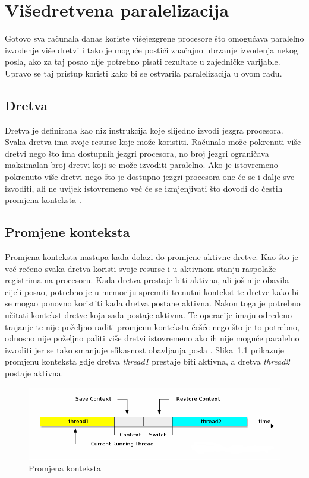 \documentclass[times, utf8, zavrsni]{fer}
\begin{document}
\chapter{Višedretvena paralelizacija}
Gotovo sva računala danas koriste višejezgrene procesore što omogućava paralelno izvođenje više dretvi i tako je moguće postići značajno ubrzanje izvođenja nekog posla, ako za taj posao nije potrebno pisati rezultate u zajedničke varijable. Upravo se taj pristup koristi kako bi se ostvarila paralelizacija u ovom radu.

\section{Dretva}
Dretva je definirana kao niz instrukcija koje slijedno izvodi jezgra procesora. Svaka dretva ima svoje resurse koje može koristiti. Računalo može pokrenuti više dretvi nego što ima dostupnih jezgri procesora, no broj jezgri ograničava maksimalan broj dretvi koji se može izvoditi paralelno. Ako je istovremeno pokrenuto više dretvi nego što je dostupno jezgri procesora one će se i dalje sve izvoditi, ali ne uvijek istovremeno već će se izmjenjivati što dovodi do čestih promjena konteksta \citep{os}.

\section{Promjene konteksta}
Promjena konteksta  nastupa kada dolazi do promjene aktivne dretve. Kao što je već rečeno svaka dretva koristi svoje resurse i u aktivnom stanju raspolaže registrima na procesoru. Kada dretva prestaje biti aktivna, ali još nije obavila cijeli posao, potrebno je u memoriju spremiti trenutni kontekst te dretve kako bi se mogao ponovno koristiti kada dretva postane aktivna. Nakon toga je potrebno učitati kontekst dretve koja sada postaje aktivna. Te operacije imaju određeno trajanje te nije poželjno raditi promjenu konteksta češće nego što je to potrebno, odnosno nije poželjno paliti više dretvi istovremeno ako ih nije moguće paralelno izvoditi jer se tako smanjuje efikasnost obavljanja posla \citep{os}. Slika~\ref{fig:contextSwitching} prikazuje promjenu konteksta gdje dretva \textit{thread1} prestaje biti aktivna, a dretva \textit{thread2} postaje aktivna.

\begin{figure}[htb]
	\centering
	\includegraphics[width=\linewidth]{figures/contextSwitching.png}
	\caption{Promjena konteksta\protect\footnotemark}
	\label{fig:contextSwitching}
\end{figure}
\end{document}
